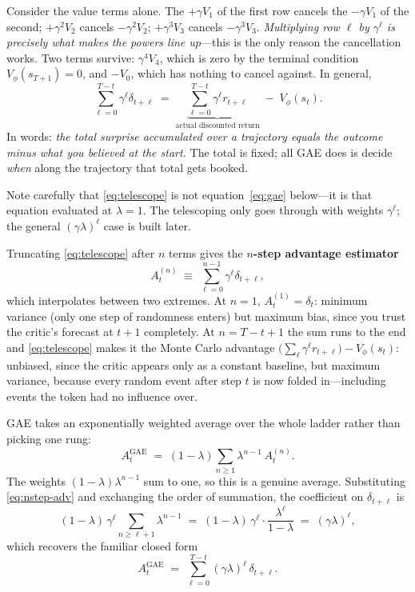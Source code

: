 Consider the value terms alone. The $+\gamma V_{1}$ of the first row cancels the
$-\gamma V_{1}$ of the second; $+\gamma^2V_{2}$ cancels $-\gamma^2V_{2}$;
$+\gamma^3V_{3}$ cancels $-\gamma^3V_{3}$. \emph{Multiplying row $\ell$ by
$\gamma^\ell$ is precisely what makes the powers line up}---this is the only
reason the cancellation works. Two terms survive: $\gamma^4V_{4}$, which is zero
by the terminal condition $V_\phi(s_{T+1})=0$, and $-V_{0}$, which has nothing
to cancel against. In general,
%
\begin{equation}
\boxed{\;\sum_{\ell=0}^{T-t}\gamma^\ell \delta_{t+\ell}
\;=\; \underbrace{\sum_{\ell=0}^{T-t}\gamma^\ell r_{t+\ell}}_{\text{actual discounted return}} \;-\; V_{\phi}(s_t). \;}
\label{eq:telescope}
\end{equation}
%
In words: \emph{the total surprise accumulated over a trajectory equals the
outcome minus what you believed at the start.} The total is fixed; all GAE does
is decide \emph{when} along the trajectory that total gets booked.

Note carefully that \eqref{eq:telescope} is not equation~\eqref{eq:gae} below---it
is that equation evaluated at $\lambda=1$. The telescoping only goes through with
weights $\gamma^\ell$; the general $(\gamma\lambda)^\ell$ case is built later.
   

Truncating \eqref{eq:telescope} after $n$ terms gives the \textbf{$n$-step
advantage estimator}
%
\begin{equation}
A^{(n)}_t \;\equiv\; \sum_{\ell=0}^{n-1}\gamma^\ell\delta_{t+\ell},
\label{eq:nstep-adv}
\end{equation}
%
which interpolates between two extremes. At $n=1$, $A^{(1)}_t=\delta_t$: minimum
variance (only one step of randomness enters) but maximum bias, since you trust
the critic's forecast at $t{+}1$ completely. At $n = T-t+1$ the sum runs to the
end and \eqref{eq:telescope} makes it the Monte Carlo advantage
$\big(\sum_\ell \gamma^\ell r_{t+\ell}\big) - V_{\phi}(s_t)$: unbiased, since the critic
appears only as a constant baseline, but maximum variance, because every random
event after step $t$ is now folded in---including events the token had no
influence over.

GAE takes an exponentially weighted average over the whole ladder rather than
picking one rung:
%
\begin{equation}
A^{\mathrm{GAE}}_t \;=\; (1-\lambda)\sum_{n\ge 1}\lambda^{n-1}\, A^{(n)}_t.
\label{eq:gae-blend}
\end{equation}
%
The weights $(1-\lambda)\lambda^{n-1}$ sum to one, so this is a genuine average.
Substituting \eqref{eq:nstep-adv} and exchanging the order of summation, the
coefficient on $\delta_{t+\ell}$ is
%
\begin{equation}
(1-\lambda)\,\gamma^\ell \sum_{n \ge \ell+1}\lambda^{n-1}
\;=\; (1-\lambda)\,\gamma^\ell \cdot \frac{\lambda^{\ell}}{1-\lambda}
\;=\; (\gamma\lambda)^\ell ,
\end{equation}
%
which recovers the familiar closed form
%
\begin{equation}
\boxed{\;A^{\mathrm{GAE}}_t \;=\; \sum_{\ell=0}^{T-t}(\gamma\lambda)^\ell\,\delta_{t+\ell}.\;}
\label{eq:gae}
\end{equation}

